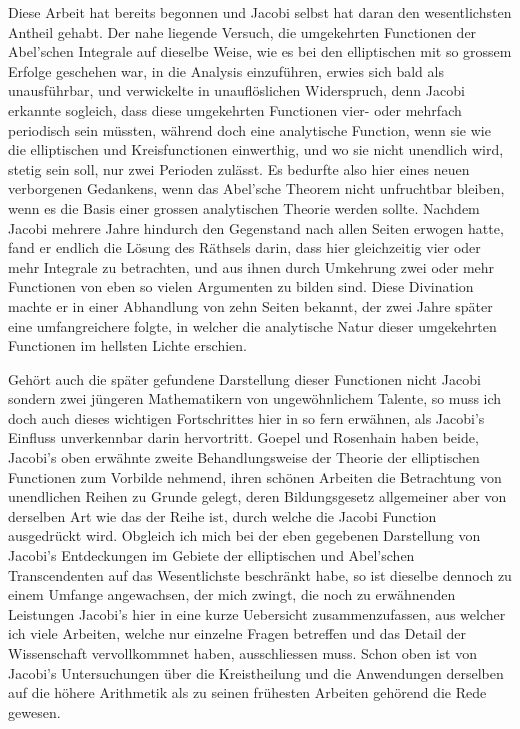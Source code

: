 \documentclass[11pt]{article}
\begin{document}
Diese Arbeit hat bereits begonnen und Jacobi selbst hat daran den wesentlichsten Antheil gehabt. Der nahe liegende Versuch, die umgekehrten Functionen der Abel’schen Integrale auf dieselbe Weise, wie es bei den elliptischen mit so grossem Erfolge geschehen war, in die Analysis einzuführen, erwies sich bald als unausführbar, und verwickelte in unauflöslichen Widerspruch, denn Jacobi erkannte sogleich, dass diese umgekehrten Functionen vier- oder mehrfach periodisch sein müssten, während doch eine analytische Function, wenn sie wie die elliptischen und Kreisfunctionen einwerthig, und wo sie nicht unendlich wird, stetig sein soll, nur zwei Perioden zulässt. Es bedurfte also hier eines neuen verborgenen Gedankens, wenn das Abel’sche Theorem nicht unfruchtbar bleiben, wenn es die Basis einer grossen analytischen Theorie werden sollte. Nachdem Jacobi mehrere Jahre hindurch den Gegenstand nach allen Seiten erwogen hatte, fand er endlich die Lösung des Räthsels darin, dass hier gleichzeitig vier oder mehr Integrale zu betrachten, und aus ihnen durch Umkehrung zwei oder mehr Functionen von eben so vielen Argumenten zu bilden sind. Diese Divination machte er in einer Abhandlung von zehn Seiten bekannt, der zwei Jahre später eine umfangreichere folgte, in welcher die analytische Natur dieser umgekehrten Functionen im hellsten Lichte erschien.

Gehört auch die später gefundene Darstellung dieser Functionen nicht Jacobi sondern zwei jüngeren Mathematikern von ungewöhnlichem Talente, so muss ich doch auch dieses wichtigen Fortschrittes hier in so fern erwähnen, als Jacobi’s Einfluss unverkennbar darin hervortritt. Goepel und Rosenhain haben beide, Jacobi’s oben erwähnte zweite Behandlungsweise der Theorie der elliptischen Functionen zum Vorbilde nehmend, ihren schönen Arbeiten die Betrachtung von unendlichen Reihen zu Grunde gelegt, deren Bildungsgesetz allgemeiner aber von derselben Art wie das der Reihe ist, durch welche die Jacobi Function ausgedrückt wird. Obgleich ich mich bei der eben gegebenen Darstellung von Jacobi's Entdeckungen im Gebiete der elliptischen und Abel’schen Transcendenten auf das Wesentlichste beschränkt habe, so ist dieselbe dennoch zu einem Umfange angewachsen, der mich zwingt, die noch zu erwähnenden Leistungen Jacobi's hier in eine kurze Uebersicht zusammenzufassen, aus welcher ich viele Arbeiten, welche nur einzelne Fragen betreffen und das Detail der Wissenschaft vervollkommnet haben, ausschliessen muss. Schon oben ist von Jacobi's Untersuchungen über die Kreistheilung und die Anwendungen derselben auf die höhere Arithmetik als zu seinen frühesten Arbeiten gehörend die Rede gewesen.
\end{document}
